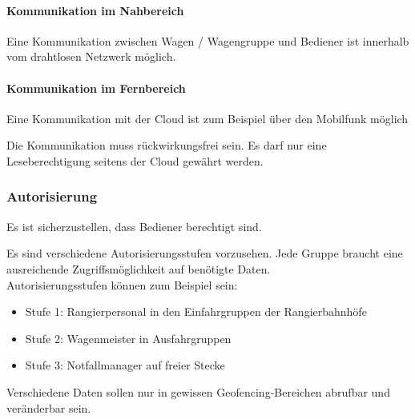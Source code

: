 \paragraph{Kommunikation im Nahbereich}
\begin{feat}
Eine Kommunikation zwischen Wagen / Wagengruppe und Bediener ist innerhalb vom drahtlosen Netzwerk möglich.
\end{feat}

\paragraph{Kommunikation im Fernbereich}
\begin{feat}
Eine Kommunikation mit der Cloud ist zum Beispiel über den Mobilfunk möglich
\end{feat}
\begin{feat}
Die Kommunikation muss rückwirkungsfrei sein. Es darf nur eine Leseberechtigung seitens der Cloud gewährt werden.
\end{feat}

\subsubsection{Autorisierung}
\begin{feat}
Es ist sicherzustellen, dass Bediener berechtigt sind.
\end{feat}
\begin{rem} [zu Anf. 41]
Es sind verschiedene Autorisierungsstufen vorzusehen. Jede Gruppe braucht eine ausreichende Zugriffsmöglichkeit auf benötigte Daten.\\
Autorisierungsstufen können zum Beispiel sein:
\begin{itemize}
    \item Stufe 1: Rangierpersonal in den Einfahrgruppen der Rangierbahnhöfe
    \item Stufe 2: Wagenmeister in Ausfahrgruppen
    \item Stufe 3: Notfallmanager auf freier Stecke
\end{itemize}
\end{rem}
\begin{rem} [zu Anf. 41]
Verschiedene Daten sollen nur in gewissen Geofencing-Bereichen abrufbar und veränderbar sein.
\end{rem}

